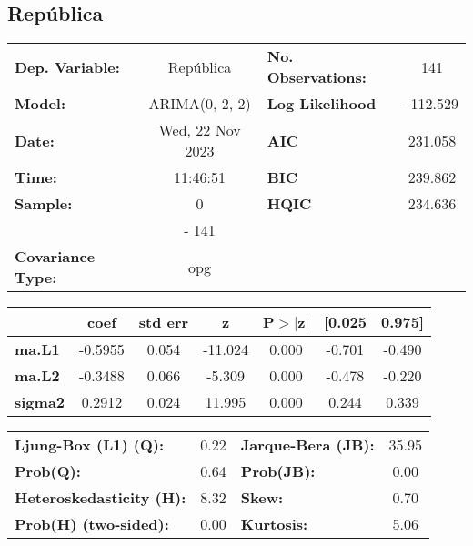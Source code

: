 \documentclass{article}%
\begin{document}
\subsection*{República}%
\begin{center}
\begin{tabular}{lclc}
\toprule
\textbf{Dep. Variable:}          &    República     & \textbf{  No. Observations:  } &    141      \\
\textbf{Model:}                  &  ARIMA(0, 2, 2)  & \textbf{  Log Likelihood     } &  -112.529   \\
\textbf{Date:}                   & Wed, 22 Nov 2023 & \textbf{  AIC                } &  231.058    \\
\textbf{Time:}                   &     11:46:51     & \textbf{  BIC                } &  239.862    \\
\textbf{Sample:}                 &        0         & \textbf{  HQIC               } &  234.636    \\
\textbf{}                        &       - 141      & \textbf{                     } &             \\
\textbf{Covariance Type:}        &       opg        & \textbf{                     } &             \\
\bottomrule
\end{tabular}
\begin{tabular}{lcccccc}
                & \textbf{coef} & \textbf{std err} & \textbf{z} & \textbf{P$> |$z$|$} & \textbf{[0.025} & \textbf{0.975]}  \\
\midrule
\textbf{ma.L1}  &      -0.5955  &        0.054     &   -11.024  &         0.000        &       -0.701    &       -0.490     \\
\textbf{ma.L2}  &      -0.3488  &        0.066     &    -5.309  &         0.000        &       -0.478    &       -0.220     \\
\textbf{sigma2} &       0.2912  &        0.024     &    11.995  &         0.000        &        0.244    &        0.339     \\
\bottomrule
\end{tabular}
\begin{tabular}{lclc}
\textbf{Ljung-Box (L1) (Q):}     & 0.22 & \textbf{  Jarque-Bera (JB):  } & 35.95  \\
\textbf{Prob(Q):}                & 0.64 & \textbf{  Prob(JB):          } &  0.00  \\
\textbf{Heteroskedasticity (H):} & 8.32 & \textbf{  Skew:              } &  0.70  \\
\textbf{Prob(H) (two-sided):}    & 0.00 & \textbf{  Kurtosis:          } &  5.06  \\
\bottomrule
\end{tabular}
\end{center}
\end{document}
